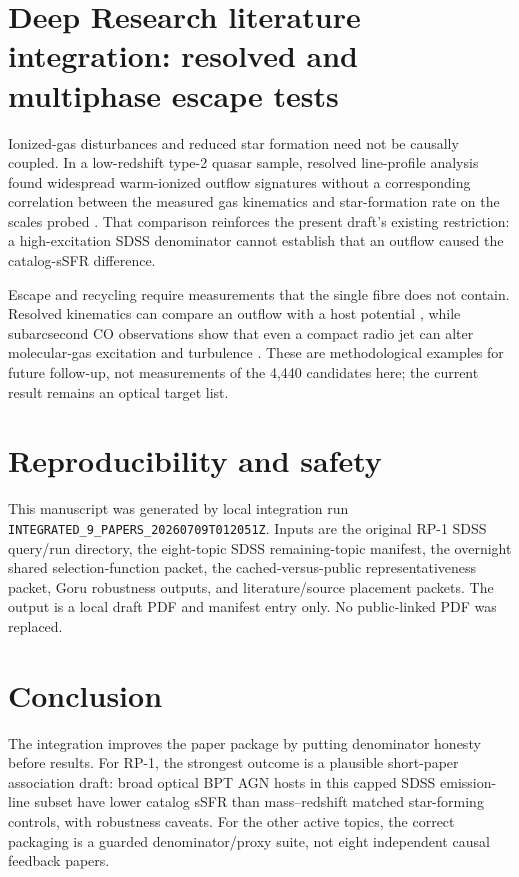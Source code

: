 \documentclass[twocolumn]{aastex631}
\begin{document}
\section{Deep Research literature integration: resolved and multiphase escape tests}\label{sec:dr-r1}
Ionized-gas disturbances and reduced star formation need not be causally coupled. In a low-redshift type-2 quasar sample, resolved line-profile analysis found widespread warm-ionized outflow signatures without a corresponding correlation between the measured gas kinematics and star-formation rate on the scales probed \citep{bessiere2024}. That comparison reinforces the present draft's existing restriction: a high-excitation SDSS denominator cannot establish that an outflow caused the catalog-sSFR difference.

Escape and recycling require measurements that the single fibre does not contain. Resolved kinematics can compare an outflow with a host potential \citep{zheng2023}, while subarcsecond CO observations show that even a compact radio jet can alter molecular-gas excitation and turbulence \citep{audibert2023}. These are methodological examples for future follow-up, not measurements of the 4,440 candidates here; the current result remains an optical target list.

\section{Reproducibility and safety}\label{sec:repro}
This manuscript was generated by local integration run \texttt{INTEGRATED\_9\_PAPERS\_20260709T012051Z}. Inputs are the original RP-1 SDSS query/run directory, the eight-topic SDSS remaining-topic manifest, the overnight shared selection-function packet, the cached-versus-public representativeness packet, Goru robustness outputs, and literature/source placement packets. The output is a local draft PDF and manifest entry only. No public-linked PDF was replaced.

\section{Conclusion}\label{sec:conclusion}
The integration improves the paper package by putting denominator honesty before results. For RP-1, the strongest outcome is a plausible short-paper association draft: broad optical BPT AGN hosts in this capped SDSS emission-line subset have lower catalog sSFR than mass--redshift matched star-forming controls, with robustness caveats. For the other active topics, the correct packaging is a guarded denominator/proxy suite, not eight independent causal feedback papers.
\end{document}
